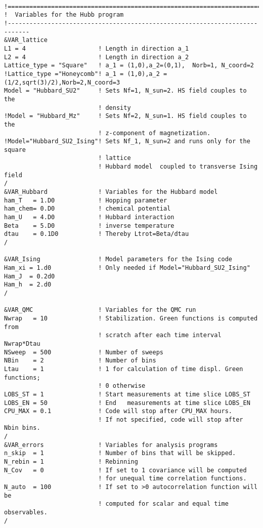 \documentclass{SciPost}
\begin{document}
\begin{lstlisting} 

!============================================================================
!  Variables for the Hubb program
!----------------------------------------------------------------------------
&VAR_lattice
L1 = 4                    ! Length in direction a_1
L2 = 4                    ! Length in direction a_2
Lattice_type = "Square"	  ! a_1 = (1,0),a_2=(0,1),  Norb=1, N_coord=2
!Lattice_type ="Honeycomb"! a_1 = (1,0),a_2 =(1/2,sqrt(3)/2),Norb=2,N_coord=3
Model = "Hubbard_SU2"     ! Sets Nf=1, N_sun=2. HS field couples to the
                          ! density
!Model = "Hubbard_Mz"     ! Sets Nf=2, N_sun=1. HS field couples to the 
                          ! z-component of magnetization.  
!Model="Hubbard_SU2_Ising"! Sets Nf_1, N_sun=2 and runs only for the square
                          ! lattice
                          ! Hubbard model  coupled to transverse Ising field
/
&VAR_Hubbard              ! Variables for the Hubbard model
ham_T   = 1.D0            ! Hopping parameter
ham_chem= 0.D0            ! chemical potential
ham_U   = 4.D0            ! Hubbard interaction
Beta    = 5.D0            ! inverse temperature
dtau    = 0.1D0           ! Thereby Ltrot=Beta/dtau
/

&VAR_Ising                ! Model parameters for the Ising code
Ham_xi = 1.d0             ! Only needed if Model="Hubbard_SU2_Ising"
Ham_J  = 0.2d0
Ham_h  = 2.d0
/

&VAR_QMC                  ! Variables for the QMC run
Nwrap   = 10              ! Stabilization. Green functions is computed from
                          ! scratch after each time interval  Nwrap*Dtau
NSweep  = 500             ! Number of sweeps
NBin    = 2               ! Number of bins
Ltau    = 1               ! 1 for calculation of time displ. Green functions;
                          ! 0 otherwise
LOBS_ST = 1               ! Start measurements at time slice LOBS_ST
LOBS_EN = 50              ! End   measurements at time slice LOBS_EN
CPU_MAX = 0.1             ! Code will stop after CPU_MAX hours. 
                          ! If not specified, code will stop after Nbin bins.
/                          
&VAR_errors               ! Variables for analysis programs
n_skip  = 1               ! Number of bins that will be skipped. 
N_rebin = 1               ! Rebinning  
N_Cov   = 0               ! If set to 1 covariance will be computed
                          ! for unequal time correlation functions.   
N_auto  = 100             ! If set to >0 autocorrelation function will be
                          ! computed for scalar and equal time observables.                  
/            
\end{lstlisting}
%
\end{document}
